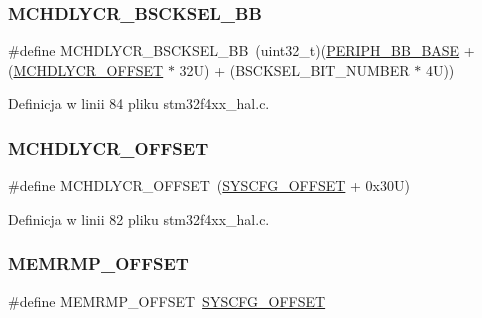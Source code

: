 \subsubsection{\texorpdfstring{M\+C\+H\+D\+L\+Y\+C\+R\+\_\+\+B\+S\+C\+K\+S\+E\+L\+\_\+\+BB}{MCHDLYCR\_BSCKSEL\_BB}}
{\footnotesize\ttfamily \#define M\+C\+H\+D\+L\+Y\+C\+R\+\_\+\+B\+S\+C\+K\+S\+E\+L\+\_\+\+BB~(uint32\+\_\+t)(\hyperlink{group___peripheral__memory__map_gaed7efc100877000845c236ccdc9e144a}{P\+E\+R\+I\+P\+H\+\_\+\+B\+B\+\_\+\+B\+A\+SE} + (\hyperlink{group___h_a_l___private___constants_ga41f6d93357082d3177da0e85b872b6cf}{M\+C\+H\+D\+L\+Y\+C\+R\+\_\+\+O\+F\+F\+S\+ET} $\ast$ 32\+U) + (\+B\+S\+C\+K\+S\+E\+L\+\_\+\+B\+I\+T\+\_\+\+N\+U\+M\+B\+E\+R $\ast$ 4\+U))}



Definicja w linii 84 pliku stm32f4xx\+\_\+hal.\+c.

\mbox{\label{group___h_a_l___private___constants_ga41f6d93357082d3177da0e85b872b6cf}} 
\subsubsection{\texorpdfstring{M\+C\+H\+D\+L\+Y\+C\+R\+\_\+\+O\+F\+F\+S\+ET}{MCHDLYCR\_OFFSET}}
{\footnotesize\ttfamily \#define M\+C\+H\+D\+L\+Y\+C\+R\+\_\+\+O\+F\+F\+S\+ET~(\hyperlink{group___h_a_l___private___constants_ga13f7abe3641989d4d063ad21962da8b0}{S\+Y\+S\+C\+F\+G\+\_\+\+O\+F\+F\+S\+ET} + 0x30\+U)}



Definicja w linii 82 pliku stm32f4xx\+\_\+hal.\+c.

\mbox{\label{group___h_a_l___private___constants_ga7f801653c361f31380f21357f92dc9af}} 
\subsubsection{\texorpdfstring{M\+E\+M\+R\+M\+P\+\_\+\+O\+F\+F\+S\+ET}{MEMRMP\_OFFSET}}
{\footnotesize\ttfamily \#define M\+E\+M\+R\+M\+P\+\_\+\+O\+F\+F\+S\+ET~\hyperlink{group___h_a_l___private___constants_ga13f7abe3641989d4d063ad21962da8b0}{S\+Y\+S\+C\+F\+G\+\_\+\+O\+F\+F\+S\+ET}}



